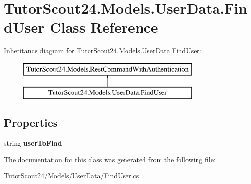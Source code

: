 \hypertarget{class_tutor_scout24_1_1_models_1_1_user_data_1_1_find_user}{}\section{Tutor\+Scout24.\+Models.\+User\+Data.\+Find\+User Class Reference}
\label{class_tutor_scout24_1_1_models_1_1_user_data_1_1_find_user}
Inheritance diagram for Tutor\+Scout24.\+Models.\+User\+Data.\+Find\+User\+:\begin{figure}[H]
\begin{center}
\leavevmode
\includegraphics[height=2.000000cm]{class_tutor_scout24_1_1_models_1_1_user_data_1_1_find_user}
\end{center}
\end{figure}
\subsection*{Properties}
\begin{DoxyCompactItemize}
\item 
\mbox{\label{class_tutor_scout24_1_1_models_1_1_user_data_1_1_find_user_a59acf3bf48cd80abb5cbc5438c9ce967}} 
string {\bfseries user\+To\+Find}
\end{DoxyCompactItemize}


The documentation for this class was generated from the following file\+:\begin{DoxyCompactItemize}
\item 
Tutor\+Scout24/\+Models/\+User\+Data/Find\+User.\+cs\end{DoxyCompactItemize}
